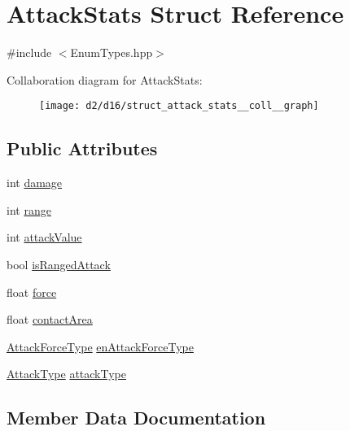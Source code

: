 \hypertarget{struct_attack_stats}{}\section{Attack\+Stats Struct Reference}
\label{struct_attack_stats}


{\ttfamily \#include $<$Enum\+Types.\+hpp$>$}



Collaboration diagram for Attack\+Stats\+:
\nopagebreak
\begin{figure}[H]
\begin{center}
\leavevmode
\texttt{[image: d2/d16/struct\_attack\_stats\_\_coll\_\_graph]}
\end{center}
\end{figure}
\subsection*{Public Attributes}
\begin{DoxyCompactItemize}
\item 
int \mbox{\hyperlink{struct_attack_stats_a358d827a9c95797171c79cecb4f907de}{damage}}
\item 
int \mbox{\hyperlink{struct_attack_stats_a6c771cd1408f202aa1c6b8bb0fff353b}{range}}
\item 
int \mbox{\hyperlink{struct_attack_stats_ae16d335630c1ff94a4147c9484818d35}{attack\+Value}}
\item 
bool \mbox{\hyperlink{struct_attack_stats_ae520cb405184191eef7d816e6ade41e4}{is\+Ranged\+Attack}}
\item 
float \mbox{\hyperlink{struct_attack_stats_ab351196c612dedf32664a1f1c98f49d0}{force}}
\item 
float \mbox{\hyperlink{struct_attack_stats_afaa92e7e1949f50eb1f6f4c6552265ba}{contact\+Area}}
\item 
\mbox{\hyperlink{_enum_types_8hpp_ad893f9959c49f07fb713f13630b7ee2d}{Attack\+Force\+Type}} \mbox{\hyperlink{struct_attack_stats_a9b9650abd264559a4a8914a67b070c1e}{en\+Attack\+Force\+Type}}
\item 
\mbox{\hyperlink{_enum_types_8hpp_a904b2f9c8f3951116c343784c59d6afe}{Attack\+Type}} \mbox{\hyperlink{struct_attack_stats_aacd65c62b2bc2d112d83a281940c6427}{attack\+Type}}
\end{DoxyCompactItemize}


\subsection{Member Data Documentation}
\mbox{\label{struct_attack_stats_aacd65c62b2bc2d112d83a281940c6427}} 
